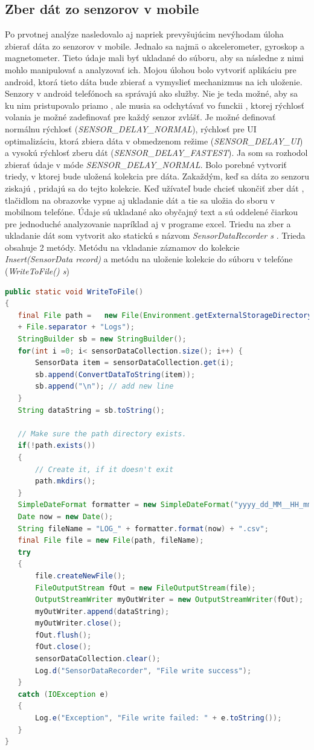 \documentclass[11pt, oneside]{report}
\begin{document}
\subsection{Zber dát zo senzorov  v mobile}
Po  prvotnej analýze nasledovalo aj napriek prevyšujúcim nevýhodam úloha zbierať dáta zo senzorov v mobile.  Jednalo sa najmä o akcelerometer, gyroskop a magnetometer. Tieto údaje mali byť  ukladané do súboru, aby sa následne z nimi mohlo manipulovať a analyzovať ich. Mojou úlohou bolo vytvoriť  aplikáciu pre android, ktorá tieto dáta bude zbierať a vymyslieť mechanizmus na ich uloženie. Senzory v android telefónoch sa správajú ako služby. Nie je teda možné, aby sa ku nim pristupovalo priamo , ale musia sa odchytávať vo funckii , ktorej rýchlosť volania  je možné zadefinovať pre každý senzor zvlášť. Je možné  definovať  normálnu rýchlosť (\textit{SENSOR\_DELAY\_NORMAL}),  rýchlosť pre UI optimalizáciu, ktorá zbiera  dáta v obmedzenom režime (\textit{SENSOR\_DELAY\_UI}) a  vysokú rýchlosť zberu dát (\textit{SENSOR\_DELAY\_FASTEST}). Ja som sa rozhodol zbierať  údaje v móde \textit{SENSOR\_DELAY\_NORMAL}. Bolo porebné vytvoriť triedy, v ktorej bude  uložená kolekcia pre  dáta. Zakaždým, keď sa dáta zo senzoru ziskajú , pridajú sa do tejto kolekcie. Keď užívateľ bude chcieť ukončiť zber dát , tlačidlom na obrazovke vypne aj ukladanie dát a tie sa uložia do sboru v mobilnom telefóne. Údaje sú ukladané ako obyčajný text a sú oddelené čiarkou pre jednoduché analyzovanie napríklad aj v programe excel. Triedu na zber a ukladanie dát  som vytvorit ako statickú s názvom \textit{SensorDataRecorder s} . Trieda obsahuje  2 metódy. Metódu na vkladanie záznamov do kolekcie  \textit{Insert(SensorData record)}  a metódu na uloženie kolekcie do súboru v telefóne (\textit{WriteToFile() s})
\newpage
\lstset{language=Java}
\begin{lstlisting}[language=Java,showstringspaces=false, caption= Metóda na ukladanie záznamov do mobilného telefónu,captionpos=b]
public static void WriteToFile()
{
   final File path =   new File(Environment.getExternalStorageDirectory()
   + File.separator + "Logs");
   StringBuilder sb = new StringBuilder();
   for(int i =0; i< sensorDataCollection.size(); i++) {
       SensorData item = sensorDataCollection.get(i);
       sb.append(ConvertDataToString(item));
       sb.append("\n"); // add new line
   }
   String dataString = sb.toString();
	
   // Make sure the path directory exists.
   if(!path.exists())
   {
       // Create it, if it doesn't exit
       path.mkdirs();
   }
   SimpleDateFormat formatter = new SimpleDateFormat("yyyy_dd_MM__HH_mm_ss");
   Date now = new Date();
   String fileName = "LOG_" + formatter.format(now) + ".csv";
   final File file = new File(path, fileName);
   try
   {
       file.createNewFile();
       FileOutputStream fOut = new FileOutputStream(file);
       OutputStreamWriter myOutWriter = new OutputStreamWriter(fOut);
       myOutWriter.append(dataString);
       myOutWriter.close();
       fOut.flush();
       fOut.close();
       sensorDataCollection.clear();
       Log.d("SensorDataRecorder", "File write success");
   }
   catch (IOException e)
   {
       Log.e("Exception", "File write failed: " + e.toString());
   }
}
\end{lstlisting}
\end{document}
